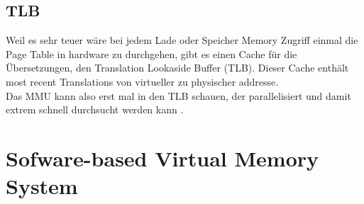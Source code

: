 \subsection{TLB}
Weil es sehr teuer wäre bei jedem Lade oder Speicher Memory Zugriff einmal die Page Table in hardware zu durchgehen,
gibt es einen Cache für die Übersetzungen, den Translation Lookaside Buffer (TLB). Dieser Cache enthält
most recent Translations von virtueller zu physischer addresse.\\
Das MMU kann also erst mal in den TLB schauen, der parallelisiert und damit extrem schnell durchsucht
werden kann \cite{drepper2007every}.


\cite{jacobVirtualMemoryContemporary1998}





\section{Sofware-based Virtual Memory System}







